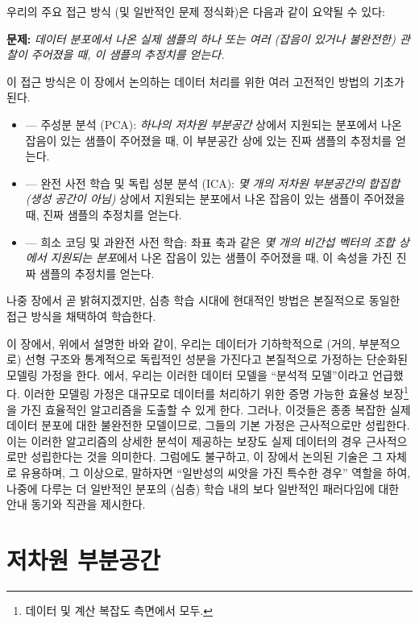 \documentclass[../../book-main_ko.tex]{subfiles}
\begin{document}
우리의 주요 접근 방식 (및 일반적인 문제 정식화)은 다음과 같이 요약될 수 있다:
\begin{tcolorbox}\centering
    \textbf{문제:} \textit{데이터 분포에서 나온 실제 샘플의 하나 또는 여러 (잡음이 있거나 불완전한) 관찰이 주어졌을 때, 이 샘플의 추정치를 얻는다.}
\end{tcolorbox}
이 접근 방식은 이 장에서 논의하는 데이터 처리를 위한 여러 고전적인 방법의 기초가 된다.
\begin{itemize}
    \item {} --- 주성분 분석 (PCA): {\em 하나의 저차원 부분공간} 상에서 지원되는 분포에서 나온 잡음이 있는 샘플이 주어졌을 때, 이 부분공간 상에 있는 진짜 샘플의 추정치를 얻는다.
    \item  {} --- 완전 사전 학습 및 독립 성분 분석 (ICA): {\em 몇 개의 저차원 부분공간의 합집합 (생성 공간이 \textit{아님})} 상에서 지원되는 분포에서 나온 잡음이 있는 샘플이 주어졌을 때, 진짜 샘플의 추정치를 얻는다.
    \item {} --- 희소 코딩 및 과완전 사전 학습: 좌표 축과 같은 {\em 몇 개의 비간섭 벡터의 조합 상에서 지원되는 분포}에서 나온 잡음이 있는 샘플이 주어졌을 때, 이 속성을 가진 진짜 샘플의 추정치를 얻는다.
\end{itemize}
나중 장에서 곧 밝혀지겠지만, 심층 학습 시대에 현대적인 방법은 본질적으로 동일한 접근 방식을 채택하여 학습한다.

이 장에서, 위에서 설명한 바와 같이, 우리는 데이터가 기하학적으로 (거의, 부분적으로) 선형 구조와 통계적으로 독립적인 성분을 가진다고 본질적으로 가정하는 단순화된 모델링 가정을 한다. 에서, 우리는 이러한 데이터 모델을 ``분석적 모델''이라고 언급했다. 이러한 모델링 가정은 대규모로 데이터를 처리하기 위한 증명 가능한 효율성 보장\footnote{데이터 및 계산 복잡도 측면에서 모두.}을 가진 효율적인 알고리즘을 도출할 수 있게 한다. 그러나, 이것들은 종종 복잡한 실제 데이터 분포에 대한 불완전한 모델이므로, 그들의 기본 가정은 근사적으로만 성립한다. 이는 이러한 알고리즘의 상세한 분석이 제공하는 보장도 실제 데이터의 경우 근사적으로만 성립한다는 것을 의미한다. 그럼에도 불구하고, 이 장에서 논의된 기술은 그 자체로 유용하며, 그 이상으로, 말하자면 ``일반성의 씨앗을 가진 특수한 경우'' 역할을 하여, 나중에 다루는 더 일반적인 분포의 (심층) 학습 내의 보다 일반적인 패러다임에 대한 안내 동기와 직관을 제시한다. %









\section{저차원 부분공간} \label{sec:lowrank}
\end{document}
